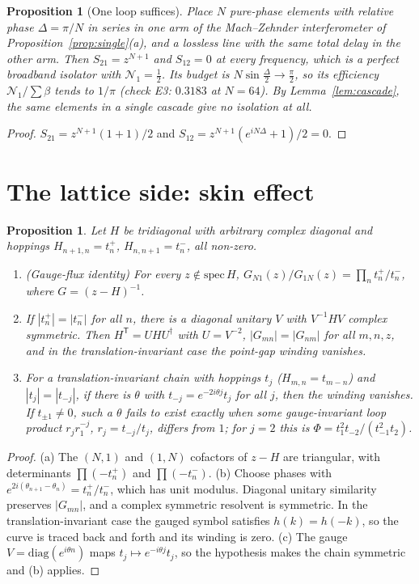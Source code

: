 \documentclass[11pt]{article}
\newtheorem{proposition}[theorem]{Proposition}
\theoremstyle{definition}
\theoremstyle{remark}
\newcommand{\NN}{\mathcal N_1}
\newcommand{\T}{\mathsf T}
\begin{document}
\begin{proposition}[One loop suffices]\label{prop:mzi}
Place $N$ pure-phase elements with relative phase $\Delta=\pi/N$ in series in one arm of the Mach--Zehnder interferometer of Proposition~\ref{prop:single}(a), and a lossless line with the same total delay in the other arm. Then $S_{21}=z^{N+1}$ and $S_{12}=0$ at every frequency, which is a perfect broadband isolator with $\NN=\frac12$. Its budget is $N\sin\frac\Delta2\to\frac\pi2$, so its efficiency $\NN/\sum\beta$ tends to $1/\pi$ (check E3: $0.3183$ at $N=64$). By Lemma~\ref{lem:cascade}, the same elements in a single cascade give no isolation at all.
\end{proposition}
\begin{proof}
$S_{21}=z^{N+1}(1+1)/2$ and $S_{12}=z^{N+1}(e^{iN\Delta}+1)/2=0$.
\end{proof}

\section{The lattice side: skin effect}\label{sec:lattice}

\begin{proposition}\label{prop:lattice}
Let $H$ be tridiagonal with arbitrary complex diagonal and hoppings $H_{n+1,n}=t^+_n$, $H_{n,n+1}=t^-_n$, all non-zero.
\begin{enumerate}
\item[(a)] (Gauge-flux identity) For every $z\notin\mathrm{spec}\,H$, $G_{N1}(z)/G_{1N}(z)=\prod_nt^+_n/t^-_n$, where $G=(z-H)^{-1}$.
\item[(b)] If $|t^+_n|=|t^-_n|$ for all $n$, there is a diagonal unitary $V$ with $V^{-1}HV$ complex symmetric. Then $H^\T=UHU^\dagger$ with $U=V^{-2}$, $|G_{mn}|=|G_{nm}|$ for all $m,n,z$, and in the translation-invariant case the point-gap winding vanishes.
\item[(c)] For a translation-invariant chain with hoppings $t_j$ ($H_{m,n}=t_{m-n}$) and $|t_j|=|t_{-j}|$, if there is $\theta$ with $t_{-j}=e^{-2i\theta j}t_j$ for all $j$, then the winding vanishes. If $t_{\pm1}\neq0$, such a $\theta$ fails to exist exactly when some gauge-invariant loop product $r_jr_1^{-j}$, $r_j=t_{-j}/t_j$, differs from $1$; for $j=2$ this is $\Phi=t_1^2t_{-2}/(t_{-1}^2t_2)$.
\end{enumerate}
\end{proposition}
\begin{proof}
(a) The $(N,1)$ and $(1,N)$ cofactors of $z-H$ are triangular, with determinants $\prod(-t^+_n)$ and $\prod(-t^-_n)$. (b) Choose phases with $e^{2i(\theta_{n+1}-\theta_n)}=t^+_n/t^-_n$, which has unit modulus. Diagonal unitary similarity preserves $|G_{mn}|$, and a complex symmetric resolvent is symmetric. In the translation-invariant case the gauged symbol satisfies $h(k)=h(-k)$, so the curve is traced back and forth and its winding is zero. (c) The gauge $V=\mathrm{diag}(e^{i\theta n})$ maps $t_j\mapsto e^{-i\theta j}t_j$, so the hypothesis makes the chain symmetric and (b) applies.
\end{proof}
\end{document}
